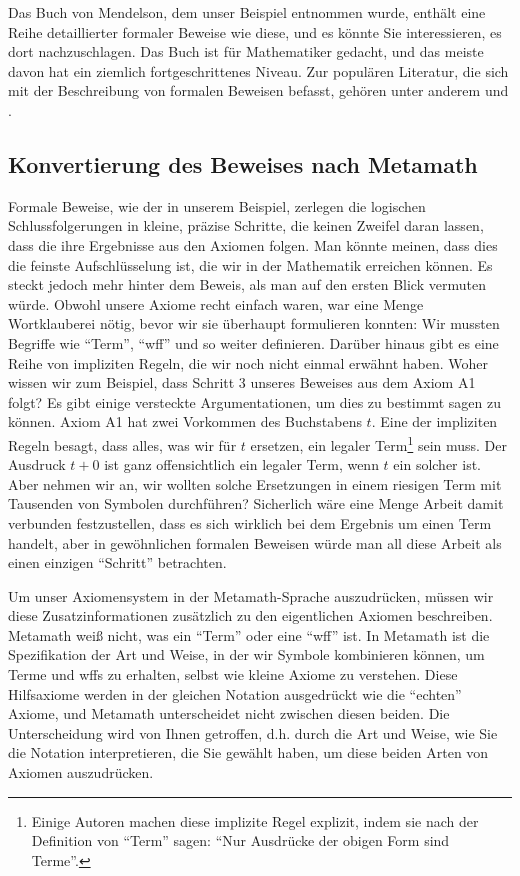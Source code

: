 Das Buch von Mendelson, dem unser Beispiel entnommen wurde, enthält eine Reihe detaillierter formaler Beweise wie diese, und es könnte Sie interessieren, es dort nachzuschlagen.  Das Buch ist für Mathematiker gedacht, und das meiste davon hat ein ziemlich fortgeschrittenes Niveau.  Zur populären Literatur, die sich mit der Beschreibung von formalen Beweisen befasst, gehören unter anderem \cite[S.~296]{Rucker} und \cite[S.~204--230]{Hofstadter}.

\subsection{Konvertierung des Beweises nach Metamath}\label{convert}

Formale Beweise, wie der in unserem Beispiel, zerlegen die logischen Schlussfolgerungen in kleine, präzise Schritte, die keinen Zweifel daran lassen, dass die ihre Ergebnisse aus den Axiomen folgen.  Man könnte meinen, dass dies die feinste Aufschlüsselung ist, die wir in der Mathematik erreichen können.  Es steckt jedoch mehr hinter dem Beweis, als man auf den ersten Blick vermuten würde. Obwohl unsere Axiome recht einfach waren, war eine Menge Wortklauberei nötig, bevor wir sie überhaupt formulieren konnten: Wir mussten Begriffe wie "`Term"', "`wff"' und so weiter definieren.  Darüber hinaus gibt es eine Reihe von impliziten Regeln, die wir noch nicht einmal erwähnt haben. Woher wissen wir zum Beispiel, dass Schritt 3 unseres Beweises aus dem Axiom A1 folgt? Es gibt einige versteckte Argumentationen, um dies zu bestimmt sagen zu können.  Axiom A1 hat zwei Vorkommen des Buchstabens $ t$.  Eine der impliziten Regeln besagt, dass alles, was wir für $ t$ ersetzen, ein legaler Term\footnote{Einige Autoren machen diese implizite Regel explizit, indem sie nach der Definition von "`Term"' sagen: "`Nur Ausdrücke der obigen Form sind Terme"'.} sein muss.  Der Ausdruck $ t+0$ ist ganz offensichtlich ein legaler Term, wenn $ t$ ein solcher ist. Aber nehmen wir an, wir wollten solche Ersetzungen in einem riesigen Term mit Tausenden von Symbolen durchführen?  Sicherlich wäre eine Menge Arbeit damit verbunden festzustellen, dass es sich wirklich bei dem Ergebnis um einen Term handelt, aber in gewöhnlichen formalen Beweisen würde man all diese Arbeit als einen einzigen "`Schritt"' betrachten.

Um unser Axiomensystem in der Metamath-Sprache auszudrücken, müssen wir diese Zusatzinformationen zusätzlich zu den eigentlichen Axiomen be\-schrei\-ben.
Metamath weiß nicht, was ein "`Term"' oder eine "`wff"' ist.  In Metamath ist die Spezifikation der Art und Weise, in der wir Symbole kombinieren können, um Terme und wffs zu erhalten, selbst wie kleine Axiome zu verstehen.  Diese Hilfsaxiome werden in der gleichen Notation ausgedrückt wie die "`echten"' Axiome, und Metamath unterscheidet nicht zwischen diesen beiden.  Die Unterscheidung wird von Ihnen getroffen, d.h. durch die Art und Weise, wie Sie die Notation interpretieren, die Sie gewählt haben, um diese beiden Arten von Axiomen auszudrücken.

